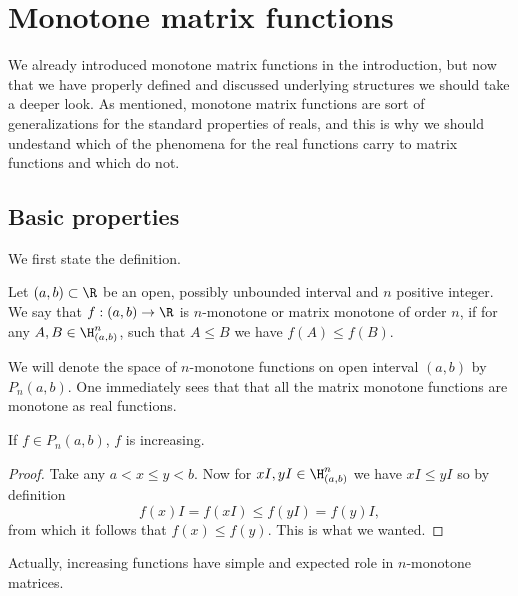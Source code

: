 \chapter{Monotone matrix functions}

We already introduced monotone matrix functions in the introduction, but now that we have properly defined and discussed underlying structures we should take a deeper look. As mentioned, monotone matrix functions are sort of generalizations for the standard properties of reals, and this is why we should undestand which of the phenomena for the real functions carry to matrix functions and which do not.

\section{Basic properties}

We first state the definition.

\begin{maar}
	Let $(a,b) \subset \R$ be an open, possibly unbounded interval and $n$ positive integer. We say that $f : (a, b) \to \R$ is $n$-monotone or matrix monotone of order $n$, if for any $A, B \in \H^{n}_{(a, b)}$, such that $A \leq B$ we have $f(A) \leq f(B)$.
\end{maar}

We will denote the space of $n$-monotone functions on open interval $(a, b)$ by $P_{n}(a, b)$. One immediately sees that that all the matrix monotone functions are monotone as real functions.

\begin{prop}
	If $f \in P_{n}(a, b)$, $f$ is increasing.
\end{prop}
\begin{proof}
	Take any $a < x \leq y < b$. Now for $xI, yI \in \H^{n}_{(a, b)}$ we have $x I \leq y I$ so by definition
	\[
		f(x) I = f(xI) \leq f(y I) = f(y) I,
	\]
	from which it follows that $f(x) \leq f(y)$. This is what we wanted.
\end{proof}

Actually, increasing functions have simple and expected role in $n$-monotone matrices.

